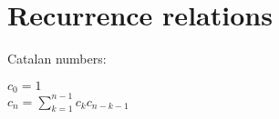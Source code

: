 \section{Recurrence relations}

Catalan numbers:

$c_0 = 1$\\
$c_n = \sum_{k=1}^{n-1} c_kc_{n-k-1}$

